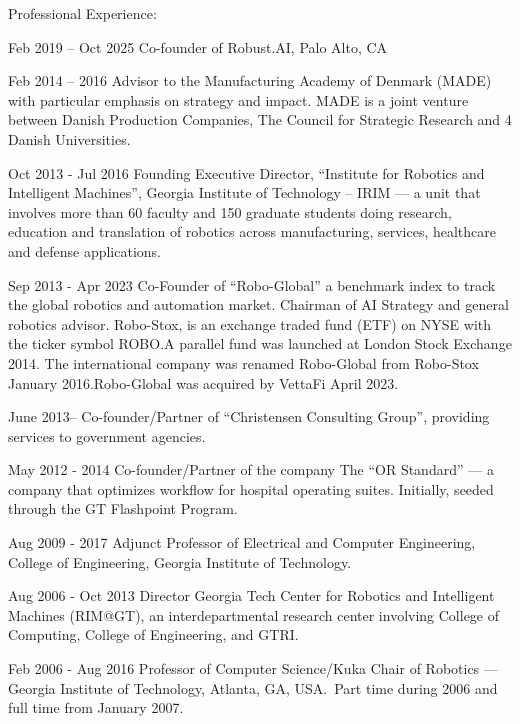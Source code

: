 \documentclass{article}
\begin{document}
\begin{cv}
\begin{cvlist}{Professional Experience:}
		\item[Feb 2019 -- Oct 2025] Co-founder of Robust.AI, Palo Alto, CA

		\item[Feb 2014 -- 2016] Advisor to the Manufacturing Academy of
		Denmark (MADE) with particular emphasis on strategy and impact. MADE
		is a joint venture between Danish Production Companies, The Council
		for Strategic Research and 4 Danish Universities.

		\item[Oct 2013 - Jul 2016] Founding Executive Director, ``Institute for
		Robotics and Intelligent Machines'', Georgia Institute of Technology --
		IRIM --- a unit that involves more than 60 faculty and 150 graduate
		students doing research, education and translation of robotics across
		manufacturing, services, healthcare and defense applications.

		\item[Sep 2013 - Apr 2023] Co-Founder of ``Robo-Global'' a benchmark index to
		track the global robotics and automation market. Chairman of AI Strategy
		and general robotics advisor. Robo-Stox, is an exchange traded fund
		(ETF) on NYSE with the ticker symbol ROBO.\@ A parallel fund was
		launched at London Stock Exchange 2014. The international company was
		renamed Robo-Global from Robo-Stox January 2016.\@ Robo-Global was
		acquired by VettaFi April 2023.

		\item[June 2013--] Co-founder/Partner of ``Christensen Consulting Group'',
		providing services to government agencies.

		\item[May 2012 - 2014] Co-founder/Partner of the company The ``OR
		Standard'' --- a company that optimizes workflow for hospital
		operating suites. Initially, seeded through the GT Flashpoint
		Program.

		\item[Aug 2009 - 2017] Adjunct Professor of Electrical and Computer
		Engineering, College of Engineering, Georgia Institute of
		Technology.

		\item[Aug 2006 - Oct 2013] Director Georgia Tech Center for Robotics and
		Intelligent Machines (RIM@GT), an interdepartmental research center
		involving College of Computing, College of Engineering, and GTRI.\@

		\item[Feb 2006 - Aug 2016]  Professor of Computer Science/Kuka
		Chair of Robotics --- Georgia Institute of Technology, Atlanta, GA,
		USA.\ Part time during 2006 and full time from January 2007.


\end{cvlist}
\end{cv}
\end{document}
